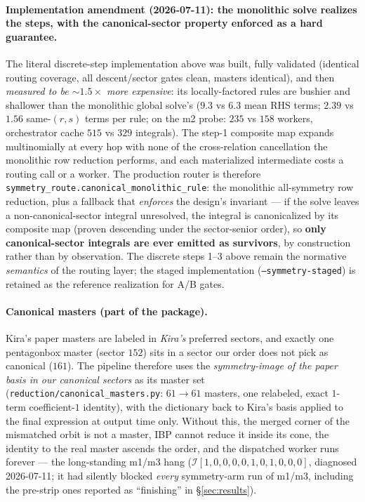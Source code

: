 \documentclass[11pt]{article}
\newcommand{\I}[1]{\mathcal{I}[#1]}
\newcommand{\code}[1]{\texttt{#1}}
\begin{document}
\paragraph{Implementation amendment (2026-07-11): the monolithic solve realizes the
steps, with the canonical-sector property enforced as a hard guarantee.} The
literal discrete-step implementation above was built, fully validated (identical
routing coverage, all descent/sector gates clean, masters identical), and then
\emph{measured to be $\sim1.5\times$ more expensive}: its locally-factored rules are
bushier and shallower than the monolithic global solve's ($9.3$ vs $6.3$ mean RHS
terms; $2.39$ vs $1.56$ same-$(r,s)$ terms per rule; on the m2 probe: $235$ vs $158$
workers, orchestrator cache $515$ vs $329$ integrals). The step-1 composite map
expands multinomially at every hop with none of the cross-relation cancellation the
monolithic row reduction performs, and each materialized intermediate costs a routing
call or a worker. The production router is therefore
\code{symmetry\_route.canonical\_monolithic\_rule}: the monolithic all-symmetry row
reduction, plus a fallback that \emph{enforces} the design's invariant --- if the
solve leaves a non-canonical-sector integral unresolved, the integral is
canonicalized by its composite map (proven descending under the sector-senior order),
so \textbf{only canonical-sector integrals are ever emitted as survivors}, by
construction rather than by observation. The discrete steps 1--3 above remain the
normative \emph{semantics} of the routing layer; the staged implementation
(\code{--symmetry-staged}) is retained as the reference realization for A/B gates.

\paragraph{Canonical masters (part of the package).} Kira's paper masters are
labeled in \emph{Kira's} preferred sectors, and exactly one pentagonbox master
(sector $152$) sits in a sector our order does not pick as canonical ($161$). The
pipeline therefore uses the \emph{symmetry-image of the paper basis in our canonical
sectors} as its master set (\code{reduction/canonical\_masters.py}: $61\to61$
masters, one relabeled, exact $1$-term coefficient-$1$ identity), with the dictionary
back to Kira's basis applied to the final expression at output time only. Without
this, the merged corner of the mismatched orbit is not a master, IBP cannot reduce it
inside its cone, the identity to the real master ascends the order, and the
dispatched worker runs forever --- the long-standing m1/m3 hang
($\I{1,0,0,0,0,1,0,1,0,0,0}$, diagnosed 2026-07-11; it had silently blocked
\emph{every} symmetry-arm run of m1/m3, including the pre-strip ones reported as
``finishing'' in \S\ref{sec:results}).
\end{document}
